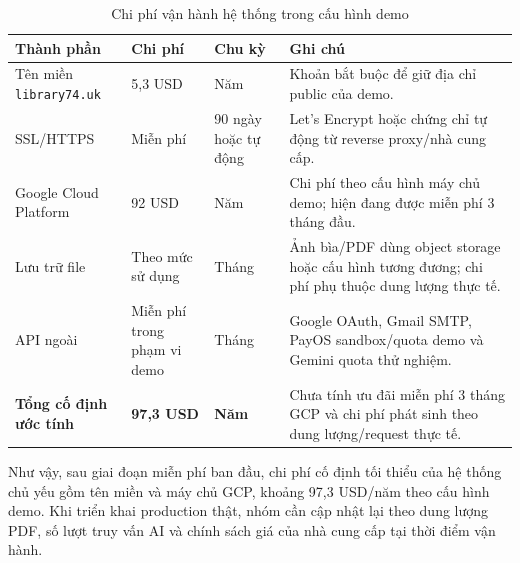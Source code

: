 \begin{table}[h]
\centering
\small
\caption{Chi phí vận hành hệ thống trong cấu hình demo}
\label{tab:hosting_cost}
\begin{tabularx}{\textwidth}{|p{3.5cm}|p{3.3cm}|p{2cm}|X|}
\hline
\textbf{Thành phần} & \textbf{Chi phí} & \textbf{Chu kỳ} & \textbf{Ghi chú} \\
\hline
Tên miền \texttt{library74.uk} & 5,3 USD & Năm & Khoản bắt buộc để giữ địa chỉ public của demo. \\
\hline
SSL/HTTPS & Miễn phí & 90 ngày hoặc tự động & Let's Encrypt hoặc chứng chỉ tự động từ reverse proxy/nhà cung cấp. \\
\hline
Google Cloud Platform & 92 USD & Năm & Chi phí theo cấu hình máy chủ demo; hiện đang được miễn phí 3 tháng đầu. \\
\hline
Lưu trữ file & Theo mức sử dụng & Tháng & Ảnh bìa/PDF dùng object storage hoặc cấu hình tương đương; chi phí phụ thuộc dung lượng thực tế. \\
\hline
API ngoài & Miễn phí trong phạm vi demo & Tháng & Google OAuth, Gmail SMTP, PayOS sandbox/quota demo và Gemini quota thử nghiệm. \\
\hline
\textbf{Tổng cố định ước tính} & \textbf{97,3 USD} & \textbf{Năm} & Chưa tính ưu đãi miễn phí 3 tháng GCP và chi phí phát sinh theo dung lượng/request thực tế. \\
\hline
\end{tabularx}
\end{table}

\noindent Như vậy, sau giai đoạn miễn phí ban đầu, chi phí cố định tối thiểu của
hệ thống chủ yếu gồm tên miền và máy chủ GCP, khoảng 97,3 USD/năm theo cấu hình
demo. Khi triển khai production thật, nhóm cần cập nhật lại theo dung lượng PDF,
số lượt truy vấn AI và chính sách giá của nhà cung cấp tại thời điểm vận hành.
